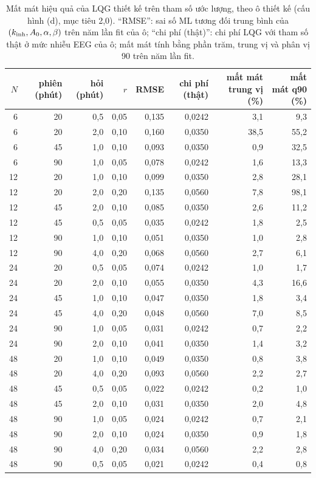\begin{table}[H]
\centering\footnotesize
\caption{Mất mát hiệu quả của LQG thiết kế trên tham số ước lượng, theo ô thiết kế (cấu hình (d), mục tiêu 2,0). ``RMSE'': sai số ML tương đối trung bình của $(k_{\mathrm{inh}},A_0,\alpha,\beta)$ trên năm lần fit của ô; ``chi phí (thật)'': chi phí LQG với tham số thật ở mức nhiễu EEG của ô; mất mát tính bằng phần trăm, trung vị và phân vị 90 trên năm lần fit.}
\label{tab:robust}
\setlength{\tabcolsep}{3.5pt}
\begin{tabular}{rrrrrrrr}
\toprule
$N$ & phiên (phút) & hỏi (phút) & $r$ & RMSE & chi phí (thật) & mất mát trung vị (\%) & mất mát q90 (\%) \\
\midrule
 6 & 20 & 0,5 & 0,05 & 0,135 & 0,0242 &  3,1 &  9,3 \\
 6 & 20 & 2,0 & 0,10 & 0,160 & 0,0350 & 38,5 & 55,2 \\
 6 & 45 & 1,0 & 0,10 & 0,093 & 0,0350 &  0,9 & 32,5 \\
 6 & 90 & 1,0 & 0,05 & 0,078 & 0,0242 &  1,6 & 13,3 \\
12 & 20 & 1,0 & 0,10 & 0,099 & 0,0350 &  2,8 & 28,1 \\
12 & 20 & 2,0 & 0,20 & 0,135 & 0,0560 &  7,8 & 98,1 \\
12 & 45 & 2,0 & 0,10 & 0,085 & 0,0350 &  2,6 & 11,2 \\
12 & 45 & 0,5 & 0,05 & 0,035 & 0,0242 &  1,8 &  2,5 \\
12 & 90 & 1,0 & 0,10 & 0,051 & 0,0350 &  1,0 &  2,8 \\
12 & 90 & 4,0 & 0,20 & 0,068 & 0,0560 &  2,7 &  6,1 \\
24 & 20 & 0,5 & 0,05 & 0,074 & 0,0242 &  1,0 &  1,7 \\
24 & 20 & 2,0 & 0,10 & 0,055 & 0,0350 &  4,3 & 16,6 \\
24 & 45 & 1,0 & 0,10 & 0,047 & 0,0350 &  1,8 &  3,4 \\
24 & 45 & 4,0 & 0,20 & 0,048 & 0,0560 &  7,0 &  8,5 \\
24 & 90 & 1,0 & 0,05 & 0,031 & 0,0242 &  0,7 &  2,2 \\
24 & 90 & 2,0 & 0,10 & 0,041 & 0,0350 &  1,4 &  3,2 \\
48 & 20 & 1,0 & 0,10 & 0,049 & 0,0350 &  0,8 &  3,8 \\
48 & 20 & 4,0 & 0,20 & 0,093 & 0,0560 &  2,2 &  2,7 \\
48 & 45 & 0,5 & 0,05 & 0,022 & 0,0242 &  0,2 &  1,0 \\
48 & 45 & 2,0 & 0,10 & 0,031 & 0,0350 &  2,0 &  4,8 \\
48 & 90 & 1,0 & 0,05 & 0,024 & 0,0242 &  0,7 &  2,1 \\
48 & 90 & 2,0 & 0,10 & 0,024 & 0,0350 &  0,9 &  1,8 \\
48 & 90 & 4,0 & 0,20 & 0,034 & 0,0560 &  2,2 &  2,8 \\
48 & 90 & 0,5 & 0,05 & 0,021 & 0,0242 &  0,4 &  0,8 \\
\bottomrule
\end{tabular}
\end{table}

